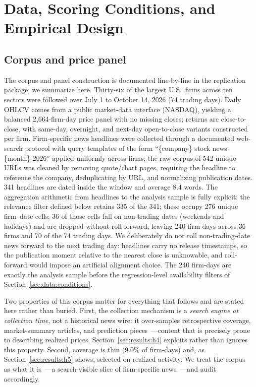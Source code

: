 \section{Data, Scoring Conditions, and Empirical Design}\label{sec:data}

\subsection{Corpus and price panel}

The corpus and panel construction is documented line-by-line in the replication package; we summarize here. Thirty-six of the largest U.S.\ firms across ten sectors were followed over July 1 to October 14, 2026 (74 trading days). Daily OHLCV comes from a public market-data interface (NASDAQ), yielding a balanced 2,664-firm-day price panel with no missing closes; returns are close-to-close, with same-day, overnight, and next-day open-to-close variants constructed per firm. Firm-specific news headlines were collected through a documented web-search protocol with query templates of the form ``\{company\} stock news \{month\} 2026'' applied uniformly across firms; the raw corpus of 542 unique URLs was cleaned by removing quote/chart pages, requiring the headline to reference the company, deduplicating by URL, and normalizing publication dates. 341 headlines are dated inside the window and average 8.4 words. The aggregation arithmetic from headlines to the analysis sample is fully explicit: the relevance filter defined below retains 335 of the 341; these occupy 276 unique firm--date cells; 36 of those cells fall on non-trading dates (weekends and holidays) and are dropped without roll-forward, leaving 240 firm-days across 36 firms and 70 of the 74 trading days. We deliberately do not roll non-trading-date news forward to the next trading day: headlines carry no release timestamps, so the publication moment relative to the nearest close is unknowable, and roll-forward would impose an artificial alignment choice. The 240 firm-days are exactly the analysis sample before the regression-level availability filters of Section~\ref{sec:data:conditions}.

Two properties of this corpus matter for everything that follows and are stated here rather than buried. First, the collection mechanism is a \emph{search engine at collection time}, not a historical news wire: it over-samples retrospective coverage, market-summary articles, and prediction pieces~---content that is precisely prone to describing realized prices. Section~\ref{sec:results:h4} exploits rather than ignores this property. Second, coverage is thin (9.0\% of firm-days) and, as Section~\ref{sec:results:h5} shows, selected on realized activity. We treat the corpus as what it is~---a search-visible slice of firm-specific news~---and audit accordingly.

